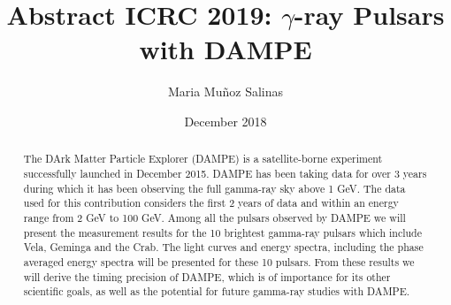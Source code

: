 \documentclass{article}
\title{Abstract ICRC 2019: $\gamma$-ray Pulsars with DAMPE}
\author{Maria Muñoz Salinas}
\date{December 2018}
\begin{document}
\maketitle

\begin{abstract}

    
    
    The DArk Matter Particle Explorer (DAMPE) is a satellite-borne experiment successfully launched in December 2015.  DAMPE has been taking data for over 3 years during which it has been observing the full gamma-ray sky above 1 GeV. The data used for this contribution considers the first 2 years of data and within an energy range from 2 GeV to 100 GeV.   Among all the pulsars observed by DAMPE we will present the measurement results for the 10 brightest gamma-ray pulsars which include Vela, Geminga and the Crab. The light curves and energy spectra, including the phase averaged energy spectra will be presented for these 10 pulsars. From these results we will derive the timing precision of DAMPE, which is of importance for its other scientific goals, as well as the potential for future gamma-ray studies with DAMPE.
\end{abstract}
\end{document}
